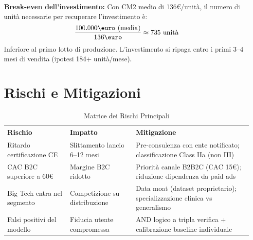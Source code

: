 \documentclass[12pt,a4paper]{article}
\begin{document}
\textbf{Break-even dell'investimento:}
Con CM2 medio di 136\euro/unità, il numero di unità necessarie per recuperare l'investimento è:
$$\frac{100.000\text{\euro (media)}}{136\text{\euro}} \approx 735 \text{ unità}$$
Inferiore al primo lotto di produzione. L'investimento si ripaga entro i primi 3--4 mesi di vendita (ipotesi 184+ unità/mese).

\section{Rischi e Mitigazioni}

\begin{table}[h!]
    \centering
    \small
    \caption{Matrice dei Rischi Principali}
    \vspace{0.3cm}
    \begin{tabularx}{\textwidth}{@{}l X X@{}}
        \toprule
        \textbf{Rischio} & \textbf{Impatto} & \textbf{Mitigazione} \\ \midrule
        Ritardo certificazione CE & Slittamento lancio 6--12 mesi & Pre-consulenza con ente notificato; classificazione Class IIa (non III) \\
        CAC B2C superiore a 60\euro & Margine B2C ridotto & Priorità canale B2B2C (CAC 15\euro); riduzione dipendenza da paid ads \\
        Big Tech entra nel segmento & Competizione su distribuzione & Data moat (dataset proprietario); specializzazione clinica vs generalismo \\
        Falsi positivi del modello & Fiducia utente compromessa & AND logico a tripla verifica + calibrazione baseline individuale \\
        \bottomrule
    \end{tabularx}
\end{table}
\end{document}
